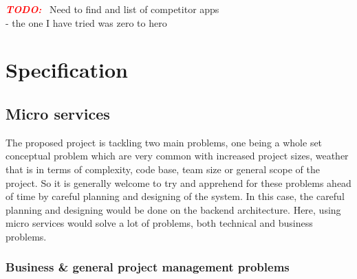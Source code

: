 \documentclass{article}
\newcommand{\vspaceconst}{-2ex}
\newcommand{\TODO}{\textbf{\textit{\textcolor{red}{TODO:}}} }
\begin{document}
\begin{multicols}{2}
\TODO~Need to find and list of competitor apps\\
- the one I have tried was zero to hero\\

\section{Specification}
\vspace{\vspaceconst}

\subsection{Micro services}
\vspace{\vspaceconst}

The proposed project is tackling two main problems, one being a whole set conceptual problem which are very common with increased project sizes, weather that is in terms of complexity, code base, team size or general scope of the project. So it is generally welcome to try and apprehend for these problems ahead of time by careful planning and designing of the system. In this case, the careful planning and designing would be done on the backend architecture. Here, using micro services would solve a lot of problems, both technical and business problems.

\subsubsection{Business \& general project management problems}
\vspace{\vspaceconst}


\end{multicols}
\end{document}
